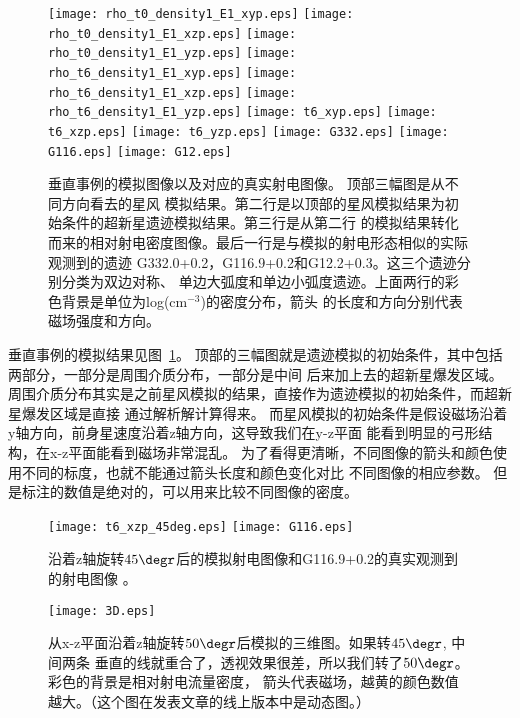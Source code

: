 \begin{figure*}
    \centering
    \texttt{[image: rho\_t0\_density1\_E1\_xyp.eps]}
    \texttt{[image: rho\_t0\_density1\_E1\_xzp.eps]}
    \texttt{[image: rho\_t0\_density1\_E1\_yzp.eps]}\newline
    \texttt{[image: rho\_t6\_density1\_E1\_xyp.eps]}
    \texttt{[image: rho\_t6\_density1\_E1\_xzp.eps]}
    \texttt{[image: rho\_t6\_density1\_E1\_yzp.eps]}\newline
    \texttt{[image: t6\_xyp.eps]}
    \texttt{[image: t6\_xzp.eps]}
    \texttt{[image: t6\_yzp.eps]}\newline
    \texttt{[image: G332.eps]}
    \texttt{[image: G116.eps]}
    \texttt{[image: G12.eps]}
    \caption{垂直事例的模拟图像以及对应的真实射电图像。 顶部三幅图是从不同方向看去的星风
    模拟结果。第二行是以顶部的星风模拟结果为初始条件的超新星遗迹模拟结果。第三行是从第二行
    的模拟结果转化而来的相对射电密度图像。最后一行是与模拟的射电形态相似的实际观测到的遗迹
    G332.0+0.2，G116.9+0.2和G12.2+0.3\citep{West2016}。这三个遗迹分别分类为双边对称、
    单边大弧度和单边小弧度遗迹。上面两行的彩色背景是单位为log(cm$^{-3}$)的密度分布，箭头
    的长度和方向分别代表磁场强度和方向。}
\label{fig:per}
\end{figure*}

垂直事例的模拟结果见图~\ref{fig:per}。
顶部的三幅图就是遗迹模拟的初始条件，其中包括两部分，一部分是周围介质分布，一部分是中间
后来加上去的超新星爆发区域。
周围介质分布其实是之前星风模拟的结果，直接作为遗迹模拟的初始条件，而超新星爆发区域是直接
通过解析解计算得来。
而星风模拟的初始条件是假设磁场沿着y轴方向，前身星速度沿着z轴方向，这导致我们在y-z平面
能看到明显的弓形结构，在x-z平面能看到磁场非常混乱。
为了看得更清晰，不同图像的箭头和颜色使用不同的标度，也就不能通过箭头长度和颜色变化对比
不同图像的相应参数。
但是标注的数值是绝对的，可以用来比较不同图像的密度。

\begin{figure}
    \centering
    \texttt{[image: t6\_xzp\_45deg.eps]}
    \texttt{[image: G116.eps]}
    \caption{沿着z轴旋转$45\degr$后的模拟射电图像和G116.9+0.2的真实观测到的射电图像
    \citep{West2016,Tian2006}。}
\label{fig:45deg}
\end{figure}

\begin{figure*}
    \centering
    \texttt{[image: 3D.eps]}
    \caption{从x-z平面沿着z轴旋转$50\degr$后模拟的三维图。如果转$45\degr$, 中间两条
    垂直的线就重合了，透视效果很差，所以我们转了$50\degr$。彩色的背景是相对射电流量密度，
    箭头代表磁场，越黄的颜色数值越大。（这个图在发表文章的线上版本中是动态图。）}
\label{fig:3D}
\end{figure*}

